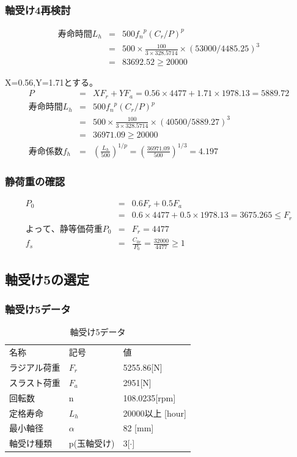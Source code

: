 \documentclass[a4j,twoside,openright,11pt]{jreport}
\begin{document}
\subsubsection{軸受け4再検討}
\begin{eqnarray}
寿命時間L_h &=& 500{f_n}^p(C_r/P)^p\\
           &=& 500 \times \frac{100}{3 \times 328.5714} \times (53000/4485.25)^3\\
           &=& 83692.52 \geq 20000
\end{eqnarray}

X=0.56,Y=1.71とする。
\begin{eqnarray}
P &=& XF_r+YF_a = 0.56 \times 4477 + 1.71 \times 1978.13 = 5889.72\\
寿命時間L_h &=& 500{f_n}^p(C_r/P)^p\\
           &=& 500 \times \frac{100}{3 \times 328.5714} \times (40500/5889.27)^3\\
           &=& 36971.09 \geq 20000\\
寿命係数f_h &=& \left( \frac{L_h}{500} \right)^{1/p} = \left( \frac{36971.09}{500} \right)^{1/3} = 4.197
\end{eqnarray}

\subsubsection{静荷重の確認}
\begin{eqnarray}
P_0&=&0.6F_r+0.5F_a\\
&=&0.6 \times 4477 + 0.5 \times 1978.13 = 3675.265 \leq F_r\\
よって、静等価荷重P_0 &=& F_r = 4477\\
f_s &=& \frac{C_{0r}}{P_0} = \frac{32000}{4477}\geq 1
\end{eqnarray}


\newpage
\subsection{軸受け5の選定}
\subsubsection{軸受け5データ}
\begin{table}[htb]
\begin{center}
  \caption{軸受け5データ}
  \begin{tabular}{lll} \hline
名称&記号&値\\
ラジアル荷重&$F_r$&5255.86[N]\\
スラスト荷重&$F_a$&2951[N]\\
回転数&n&108.0235[rpm]\\
定格寿命&$L_h$&20000以上 [hour]\\
最小軸径&$\alpha$&82 [mm]\\
軸受け種類&p(玉軸受け)&3[$\cdot$]\\
\hline
  \end{tabular}
\end{center}
\end{table}
\end{document}
